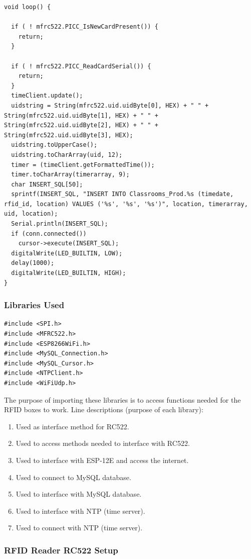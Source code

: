 \documentclass[12pt]{article}
\begin{document}
\begin{spacing}{1.2}
\begin{lstlisting}[language=Arduino]
void loop() {

  if ( ! mfrc522.PICC_IsNewCardPresent()) {
    return;
  }

  if ( ! mfrc522.PICC_ReadCardSerial()) {
    return;
  }
  timeClient.update();
  uidstring = String(mfrc522.uid.uidByte[0], HEX) + " " + String(mfrc522.uid.uidByte[1], HEX) + " " + String(mfrc522.uid.uidByte[2], HEX) + " " + String(mfrc522.uid.uidByte[3], HEX);
  uidstring.toUpperCase();
  uidstring.toCharArray(uid, 12);
  timer = (timeClient.getFormattedTime());
  timer.toCharArray(timerarray, 9);
  char INSERT_SQL[50];
  sprintf(INSERT_SQL, "INSERT INTO Classrooms_Prod.%s (timedate, rfid_id, location) VALUES ('%s', '%s', '%s')", location, timerarray, uid, location);
  Serial.println(INSERT_SQL);
  if (conn.connected())
    cursor->execute(INSERT_SQL);
  digitalWrite(LED_BUILTIN, LOW);
  delay(1000);                
  digitalWrite(LED_BUILTIN, HIGH); 
} 
\end{lstlisting}

\subsubsection{Libraries Used}
\begin{lstlisting}[language=Arduino]  
#include <SPI.h>
#include <MFRC522.h>
#include <ESP8266WiFi.h>           
#include <MySQL_Connection.h>
#include <MySQL_Cursor.h>
#include <NTPClient.h>
#include <WiFiUdp.h>  
\end{lstlisting}
The purpose of importing these libraries is to access functions needed for the RFID boxes to work.
\newline\newline
Line descriptions (purpose of each library):
\begin{enumerate}
	\item Used as interface method for RC522.
	\item Used to access methods needed to interface with RC522.
	\item Used to interface with ESP-12E and access the internet.
	\item Used to connect to MySQL database.
	\item Used to interface with MySQL database.
	\item Used to interface with NTP (time server).
	\item Used to connect with NTP (time server).
\end{enumerate}

\subsubsection{RFID Reader RC522 Setup}


\end{spacing}
\end{document}
